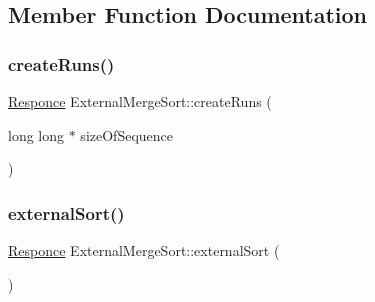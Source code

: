 \subsection{Member Function Documentation}
\hypertarget{class_external_merge_sort_a54203f48d659003f5a75425354d4e262}{}\label{class_external_merge_sort_a54203f48d659003f5a75425354d4e262} 
\subsubsection{\texorpdfstring{create\+Runs()}{createRuns()}}
{\footnotesize\ttfamily \hyperlink{_structures_8h_a9864d6ef28dd6e38416afac4426b3491}{Responce} External\+Merge\+Sort\+::create\+Runs (\begin{DoxyParamCaption}\item[{long long $\ast$}]{size\+Of\+Sequence }\end{DoxyParamCaption})\hspace{0.3cm}{\ttfamily [private]}}

\hypertarget{class_external_merge_sort_aa0d80e41effe3a13c0d63b33e208918f}{}\label{class_external_merge_sort_aa0d80e41effe3a13c0d63b33e208918f} 
\subsubsection{\texorpdfstring{external\+Sort()}{externalSort()}}
{\footnotesize\ttfamily \hyperlink{_structures_8h_a9864d6ef28dd6e38416afac4426b3491}{Responce} External\+Merge\+Sort\+::external\+Sort (\begin{DoxyParamCaption}{ }\end{DoxyParamCaption})}

\hypertarget{class_external_merge_sort_a8b4f951d9ee53818b8d3d4e84e2a1aa4}{}\label{class_external_merge_sort_a8b4f951d9ee53818b8d3d4e84e2a1aa4} 
